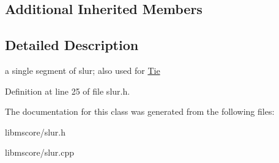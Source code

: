 \subsection*{Additional Inherited Members}


\subsection{Detailed Description}
a single segment of slur; also used for \hyperlink{class_ms_1_1_tie}{Tie} 

Definition at line 25 of file slur.\+h.



The documentation for this class was generated from the following files\+:\begin{DoxyCompactItemize}
\item 
libmscore/slur.\+h\item 
libmscore/slur.\+cpp\end{DoxyCompactItemize}
